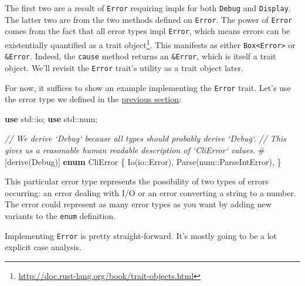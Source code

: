 \documentclass[a4paper,]{book}
\newenvironment{Shaded}{\begin{snugshade}}{\end{snugshade}}
\newcommand{\KeywordTok}[1]{\textcolor[rgb]{0.13,0.29,0.53}{\textbf{{#1}}}}
\newcommand{\CommentTok}[1]{\textcolor[rgb]{0.56,0.35,0.01}{\textit{{#1}}}}
\newcommand{\BuiltInTok}[1]{{#1}}
\newcommand{\AttributeTok}[1]{\textcolor[rgb]{0.77,0.63,0.00}{{#1}}}
\newcommand{\NormalTok}[1]{{#1}}
\renewcommand{\href}[2]{#2\footnote{\url{#1}}}
\begin{document}
The first two are a result of \texttt{Error} requiring impls for both
\texttt{Debug} and \texttt{Display}. The latter two are from the two
methods defined on \texttt{Error}. The power of \texttt{Error} comes
from the fact that all error types impl \texttt{Error}, which means
errors can be existentially quantified as a
\href{http://doc.rust-lang.org/book/trait-objects.html}{trait object}.
This manifests as either \texttt{Box\textless{}Error\textgreater{}} or
\texttt{\&Error}. Indeed, the \texttt{cause} method returns an
\texttt{\&Error}, which is itself a trait object. We'll revisit the
\texttt{Error} trait's utility as a trait object later.

For now, it suffices to show an example implementing the \texttt{Error}
trait. Let's use the error type we defined in the
\protect\hyperlink{defining-your-own-error-type}{previous section}:

\begin{Shaded}
\begin{Highlighting}[]
\KeywordTok{use} \NormalTok{std::io;}
\KeywordTok{use} \NormalTok{std::num;}

\CommentTok{// We derive `Debug` because all types should probably derive `Debug`.}
\CommentTok{// This gives us a reasonable human readable description of `CliError` values.}
\AttributeTok{#[}\NormalTok{derive}\AttributeTok{(}\BuiltInTok{Debug}\AttributeTok{)]}
\KeywordTok{enum} \NormalTok{CliError \{}
    \NormalTok{Io(io::Error),}
    \NormalTok{Parse(num::ParseIntError),}
\NormalTok{\}}
\end{Highlighting}
\end{Shaded}

This particular error type represents the possibility of two types of
errors occurring: an error dealing with I/O or an error converting a
string to a number. The error could represent as many error types as you
want by adding new variants to the \texttt{enum} definition.

Implementing \texttt{Error} is pretty straight-forward. It's mostly
going to be a lot explicit case analysis.
\end{document}
